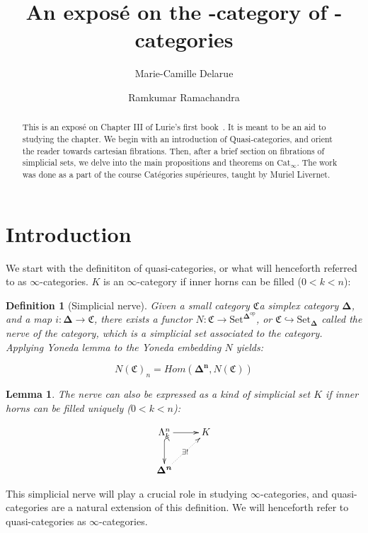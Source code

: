 \documentclass[12pt]{amsart}
\title{An exposé on the \8-category of \8-categories}
\author{Marie-Camille Delarue}
\author{Ramkumar Ramachandra}
\newcommand{\8}{\ensuremath{\infty}}
\newcommand{\C}{\ensuremath{\mathfrak{C}}}
\newcommand{\Horn}[2]{\ensuremath{\Lambda^{#1}_{#2}}}
\newcommand{\Simplex}[1][n]{\ensuremath{\boldsymbol{\Delta^{#1}}}}
\newcommand{\SSet}{\ensuremath{\text{Set}_{\boldsymbol{\Delta}}}}
\newcommand{\Catinf}{\ensuremath{\text{Cat}_{\infty}}}
\newcommand{\Delt}{\ensuremath{\boldsymbol{\Delta}}}
\newcommand{\op}[1]{\ensuremath{{#1}^{\text{op}}}}
\newcommand{\Set}{\ensuremath{\text{Set}}}
\newtheorem{definition}{Definition}
\newtheorem{lemma}{Lemma}
\begin{document}
\begin{abstract}
  This is an exposé on Chapter III of Lurie's first book~\cite{lurie09}. It is meant to be an aid to studying the chapter. We begin with an introduction of Quasi-categories, and orient the reader towards cartesian fibrations. Then, after a brief section on fibrations of simplicial sets, we delve into the main propositions and theorems on \Catinf. The work was done as a part of the course Catégories supérieures, taught by Muriel Livernet.
\end{abstract}
\maketitle
\tableofcontents

\section{Introduction}

We start with the definititon of quasi-categories, or what will henceforth referred to as $\8$-categories. $K$ is an $\8$-category if inner horns can be filled ($0 < k < n$):

\begin{definition}[Simplicial nerve]
  Given a small category \C a simplex category \Delt, and a map $i : \Delt \rightarrow \C$, there exists a functor $N : \C \rightarrow \Set^{\op\Delt}$, or $\C \hookrightarrow \SSet$ called the nerve of the category, which is a simplicial set associated to the category. Applying Yoneda lemma to the Yoneda embedding $N$ yields:

  $$
    N(\C)_n = Hom(\Simplex, N(\C))
  $$
\end{definition}

\begin{lemma}
  The nerve can also be expressed as a kind of simplicial set $K$ if inner horns can be filled uniquely ($0 < k < n$):

  $$
    \begin{xy}
      \xymatrix{
      \Horn{n}{k}\ar[r]\ar@{^{(}->}[d] & K \\
      \Simplex\ar@{.>}[ur]|{\exists!} &
      }
    \end{xy}
  $$
\end{lemma}

This simplicial nerve will play a crucial role in studying \8-categories, and quasi-categories are a natural extension of this definition. We will henceforth refer to quasi-categories as \8-categories.
\end{document}

